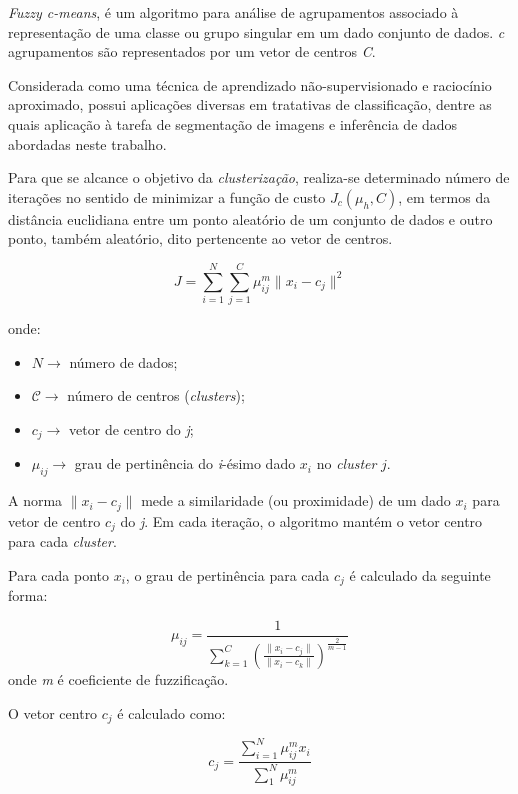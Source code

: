 \documentclass[12pt,a4paper]{article}
\numberwithin{equation}{section}
\begin{document}
\textit{Fuzzy c-means}, é um algoritmo para análise de agrupamentos associado à representação de uma classe ou grupo singular em um dado conjunto de dados. \textit{c} agrupamentos são representados por um vetor de centros \textit{C}.

Considerada como uma técnica de aprendizado não-supervisionado e raciocínio aproximado, possui aplicações diversas em tratativas de classificação, dentre as quais aplicação à tarefa de segmentação de imagens e inferência de dados abordadas neste trabalho.

Para que se alcance o objetivo da \textit{clusterização}, realiza-se determinado número de iterações no sentido de minimizar a função de custo $J_{c}(\mu_{h},C)$, em termos da distância euclidiana entre um ponto aleatório de um conjunto de dados e outro ponto, também aleatório, dito pertencente ao vetor de centros. 

\begin{equation}
J=\sum_{i=1}^{N}\sum_{j=1}^{C}\mu_{ij}^{m}\lVert x_{i}-c_{j} \rVert^2
\end{equation}

onde:
\begin{itemize}
	\item $N\longrightarrow$ número de dados;
	\item $\mathcal{C}\longrightarrow$ número de centros (\textit{clusters});
	\item $c_{j}\longrightarrow$ vetor de centro do \textit{j};
	\item $\mu_{ij}\longrightarrow$ grau de pertinência do \textit{i}-ésimo dado $x_{i}$ no \textit{cluster} $j$.
\end{itemize}

A norma $\lVert x_{i}-c_{j} \rVert$ mede a similaridade (ou proximidade) de um dado $x_{i}$ para vetor de centro $c_{j}$ do \textit{j}. Em cada iteração, o algoritmo mantém o vetor centro para cada \textit{cluster}. 

Para cada ponto $x_{i}$, o grau de pertinência para cada $c_{j}$ é calculado da seguinte forma:

\begin{equation}
\mu_{ij}=\frac{1}{\sum_{k=1}^{C}(\frac{\lVert x_{i}-c_{j} \rVert}{\lVert x_{i}-c_{k} \rVert})^\frac{2}{m-1}}
\end{equation}
onde \textit{m} é coeficiente de fuzzificação.

O vetor centro $c_{j}$ é calculado como:

\begin{equation}
c_{j}=\frac{\sum_{i=1}^{N}\mu_{ij}^m x_{i}}{\sum_{1}^{N}\mu_{ij}^m}
\end{equation}
\end{document}
